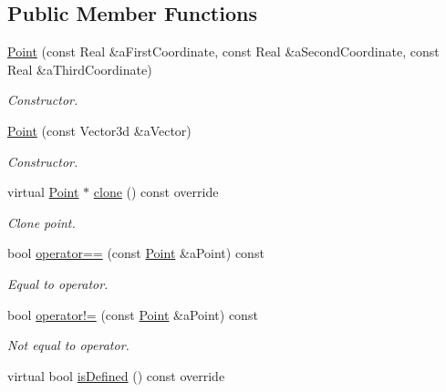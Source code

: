 \subsection*{Public Member Functions}
\begin{DoxyCompactItemize}
\item 
\hyperlink{classlibrary_1_1math_1_1geom_1_1d3_1_1objects_1_1_point_a617e690ab6091af3de729cee337e309e}{Point} (const Real \&a\+First\+Coordinate, const Real \&a\+Second\+Coordinate, const Real \&a\+Third\+Coordinate)
\begin{DoxyCompactList}\small\item\em Constructor. \end{DoxyCompactList}\item 
\hyperlink{classlibrary_1_1math_1_1geom_1_1d3_1_1objects_1_1_point_aa247b14e8237860aafa86bee66f074e0}{Point} (const Vector3d \&a\+Vector)
\begin{DoxyCompactList}\small\item\em Constructor. \end{DoxyCompactList}\item 
virtual \hyperlink{classlibrary_1_1math_1_1geom_1_1d3_1_1objects_1_1_point}{Point} $\ast$ \hyperlink{classlibrary_1_1math_1_1geom_1_1d3_1_1objects_1_1_point_a32aa1e233c6ac5341605961f6bf0f210}{clone} () const override
\begin{DoxyCompactList}\small\item\em Clone point. \end{DoxyCompactList}\item 
bool \hyperlink{classlibrary_1_1math_1_1geom_1_1d3_1_1objects_1_1_point_a0e89a102cf4e3f77b26e0bf234a69075}{operator==} (const \hyperlink{classlibrary_1_1math_1_1geom_1_1d3_1_1objects_1_1_point}{Point} \&a\+Point) const
\begin{DoxyCompactList}\small\item\em Equal to operator. \end{DoxyCompactList}\item 
bool \hyperlink{classlibrary_1_1math_1_1geom_1_1d3_1_1objects_1_1_point_abf144133b487834091866a71116ce31a}{operator!=} (const \hyperlink{classlibrary_1_1math_1_1geom_1_1d3_1_1objects_1_1_point}{Point} \&a\+Point) const
\begin{DoxyCompactList}\small\item\em Not equal to operator. \end{DoxyCompactList}\item 
virtual bool \hyperlink{classlibrary_1_1math_1_1geom_1_1d3_1_1objects_1_1_point_a9874289efeb457ada4b32d7eb1e012f6}{is\+Defined} () const override

\end{DoxyCompactItemize}
